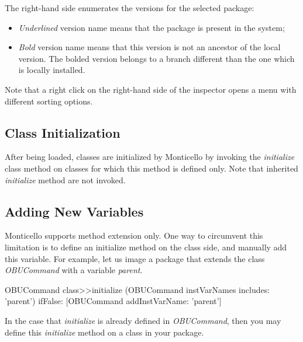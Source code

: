 \documentclass[a4paper,10pt,twoside]{book}
\begin{document}
The right-hand side enumerates the versions for the selected package:

\begin{itemize}
\item \emph{Underlined} version name means that the package is present in the system;
\item \emph{Bold} version name means that this version is not an ancestor of the local version. The bolded version belongs to a branch different than the one which is locally installed.
\end{itemize}

Note that a right click on the right-hand side of the inspector opens a menu with different sorting options.


\subsection{Class Initialization}

After being loaded, classes are initialized by Monticello by invoking the \emph{initialize} class method on classes for which this method is defined only. Note that inherited \emph{initialize} method are not invoked. 

\subsection{Adding New Variables}

Monticello supports method extension only. One way to circumvent this limitation is to define an initialize method on the class side, and manually add this variable. For example, let us image a package that extends the class \emph{OBUCommand} with a variable \emph{parent}.

\begin{code}

OBUCommand class>>initialize
	(OBUCommand instVarNames includes: 'parent') 
		ifFalse: [OBUCommand addInstVarName: 'parent']
\end{code}

In the case that \emph{initialize} is already defined in \emph{OBUCommand}, then you may define this \emph{initialize} method on a class in your package.
\end{document}
